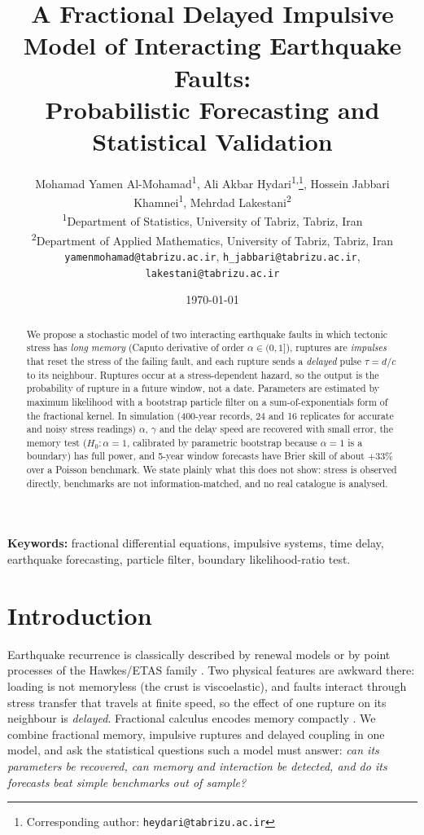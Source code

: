 \documentclass[10pt,a4paper]{article}
\title{\textbf{A Fractional Delayed Impulsive Model of Interacting Earthquake Faults:\\ Probabilistic Forecasting and Statistical Validation}}
\author{Mohamad Yamen Al-Mohamad\textsuperscript{1}, Ali Akbar Hydari\textsuperscript{1,}\thanks{Corresponding author: \texttt{heydari@tabrizu.ac.ir}}, Hossein Jabbari Khamnei\textsuperscript{1}, Mehrdad Lakestani\textsuperscript{2}\\[3pt]
\small\textsuperscript{1}Department of Statistics, University of Tabriz, Tabriz, Iran\\
\small\textsuperscript{2}Department of Applied Mathematics, University of Tabriz, Tabriz, Iran\\
\small \texttt{yamenmohamad@tabrizu.ac.ir}, \texttt{h\_jabbari@tabrizu.ac.ir}, \texttt{lakestani@tabrizu.ac.ir}}
\date{\today}
\begin{document}
\maketitle
\begin{abstract}
We propose a stochastic model of two interacting earthquake faults in which tectonic stress has \emph{long memory} (Caputo derivative of order $\alpha\in(0,1]$), ruptures are \emph{impulses} that reset the stress of the failing fault, and each rupture sends a \emph{delayed} pulse $\tau=d/c$ to its neighbour. Ruptures occur at a stress-dependent hazard, so the output is the probability of rupture in a future window, not a date. Parameters are estimated by maximum likelihood with a bootstrap particle filter on a sum-of-exponentials form of the fractional kernel. In simulation (400-year records, 24 and 16 replicates for accurate and noisy stress readings) $\alpha$, $\gamma$ and the delay speed are recovered with small error, the memory test ($H_0:\alpha=1$, calibrated by parametric bootstrap because $\alpha=1$ is a boundary) has full power, and 5-year window forecasts have Brier skill of about $+33\%$ over a Poisson benchmark. We state plainly what this does not show: stress is observed directly, benchmarks are not information-matched, and no real catalogue is analysed.
\end{abstract}
\noindent\textbf{Keywords:} fractional differential equations, impulsive systems, time delay, earthquake forecasting, particle filter, boundary likelihood-ratio test.

\section{Introduction}
Earthquake recurrence is classically described by renewal models or by point processes of the Hawkes/ETAS family \citep{Hawkes1971,Ogata1988}. Two physical features are awkward there: loading is not memoryless (the crust is viscoelastic), and faults interact through stress transfer that travels at finite speed, so the effect of one rupture on its neighbour is \emph{delayed}. Fractional calculus encodes memory compactly \citep{Podlubny1999,Diethelm2010}. We combine fractional memory, impulsive ruptures and delayed coupling in one model, and ask the statistical questions such a model must answer: \emph{can its parameters be recovered, can memory and interaction be detected, and do its forecasts beat simple benchmarks out of sample?}
\end{document}
